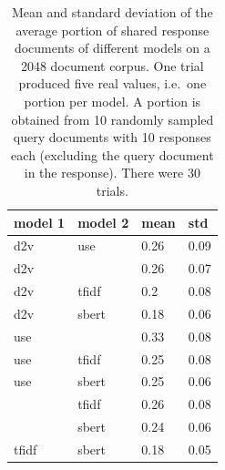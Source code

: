 \begin{table}[]
    \centering
    \caption{Mean and standard deviation of the average portion of shared response documents of different models on a 2048 document corpus.
    One trial produced five real values, i.e.\ one portion per model.
    A portion is obtained from 10 randomly sampled query documents with 10 responses each (excluding the query document in the response).
    There were 30 trials.
    }
    \begin{tabular}{|l|l|l|l|}
    \hline
    \rowcolor[HTML]{C0C0C0} 
    \textbf{model 1} & \textbf{model 2} & \textbf{mean} & \textbf{std} \\ \hline
    \ac{d2v}          & \ac{use}        & 0.26          & 0.09         \\ \hline
    \ac{d2v}          & \infersent{}            & 0.26          & 0.07         \\ \hline
    \ac{d2v}          & \ac{tfidf}            & 0.2           & 0.08         \\ \hline
    \ac{d2v}          & \ac{sbert}          & 0.18          & 0.06         \\ \hline
    \ac{use}        & \infersent{}            & 0.33          & 0.08         \\ \hline
    \ac{use}        & \ac{tfidf}            & 0.25          & 0.08         \\ \hline
    \ac{use}        & \ac{sbert}          & 0.25          & 0.06         \\ \hline
    \infersent{}            & \ac{tfidf}            & 0.26          & 0.08         \\ \hline
    \infersent{}            & \ac{sbert}          & 0.24          & 0.06         \\ \hline
    \ac{tfidf}            & \ac{sbert}          & 0.18          & 0.05         \\ \hline
    \end{tabular}
    \label{tab:mean_std_portion_shared_query_results}
\end{table}
